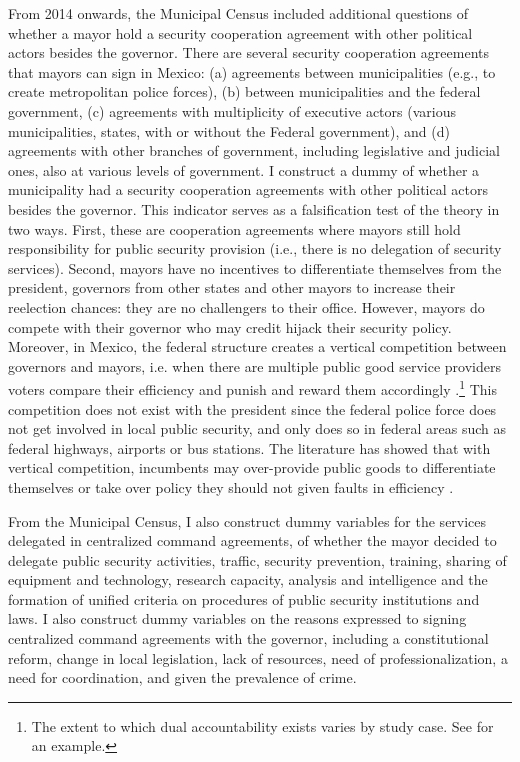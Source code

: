 \documentclass[12pt]{amsart}
\numberwithin{equation}{section}
\theoremstyle{definition}
\theoremstyle{definition}
\theoremstyle{definition}
\begin{document}
From 2014 onwards, the Municipal Census included additional questions of whether a mayor hold a security  cooperation agreement with other political actors besides the governor. There are several security cooperation agreements that mayors can sign in Mexico: (a) agreements between municipalities (e.g., to create metropolitan police forces), (b) between municipalities and the federal government, (c) agreements with multiplicity of executive actors (various municipalities, states, with or without the Federal government), and (d) agreements with other branches of government, including legislative and judicial ones, also at various levels of government. I construct a dummy of whether a municipality had a security cooperation agreements with other political actors besides the governor. This indicator serves as a falsification test of the theory in two ways. First, these are cooperation agreements where mayors still hold responsibility for public security provision (i.e., there is no delegation of security services). Second, mayors have no incentives to differentiate themselves from the president, governors from other states and other mayors to increase their reelection chances: they are no challengers to their office. However, mayors do compete with their governor who may credit hijack their security policy. Moreover, in Mexico, the federal structure creates a vertical competition between governors and mayors, i.e. when there are multiple public good service providers voters compare their efficiency and punish and reward them accordingly \citep{treisman_2000}.\footnote{The extent to which dual accountability exists varies by study case. See \citet{rodden_2010} for an example.} This competition does not exist with the president since the federal police force does not get involved in local public security, and only does so in federal areas such as federal highways, airports or bus stations. The literature has showed that with vertical competition, incumbents may over-provide public goods to differentiate themselves or take over policy they should not given faults in efficiency \citep{salmon_1987, Breton_1996, treisman_2000}.


From the Municipal Census, I also construct dummy variables for the services delegated in centralized command agreements, of whether the mayor decided to delegate public security activities, traffic, security prevention, training, sharing of equipment and technology, research capacity, analysis and intelligence and the formation of unified criteria on procedures of public security institutions and laws. I also construct dummy variables on the reasons expressed to signing centralized command agreements with the governor, including a constitutional reform, change in local legislation, lack of resources, need of professionalization, a need for coordination, and given the prevalence of crime.
 
\end{document}
